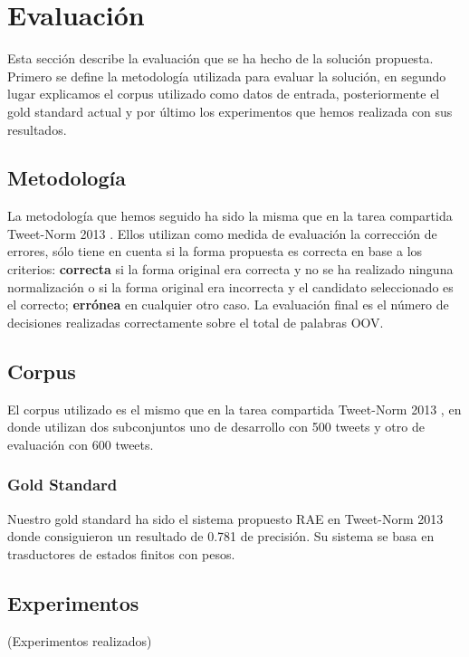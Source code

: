 \documentclass[spanish,12pt, a4paper,twoside]{paper}
\let\oldsection\section
\def\section{\cleardoublepage\oldsection}
\begin{document}
\section{Evaluación}\label{sec:evaluacion}
Esta sección describe la evaluación que se ha hecho de la solución propuesta. Primero se define la metodología utilizada para evaluar la solución, en segundo lugar explicamos el corpus utilizado como datos de entrada, posteriormente el gold standard actual y por último los experimentos que hemos realizada con sus resultados.
\subsection{Metodología}\label{sec:metodologia}
La metodología que hemos seguido ha sido la misma que en la tarea compartida Tweet-Norm 2013 \cite{tweetnorm}. Ellos utilizan como medida de evaluación la corrección de errores, sólo tiene en cuenta si la forma propuesta es correcta en base a los criterios: \textbf{correcta} si la forma original era correcta y no se ha realizado ninguna normalización o si la forma original era incorrecta y el candidato seleccionado es el correcto; \textbf{errónea} en cualquier otro caso. La evaluación final es el número de decisiones realizadas correctamente sobre el total de palabras OOV.

\subsection{Corpus}\label{sec:corpus}
El corpus utilizado es el mismo que en la tarea compartida Tweet-Norm 2013 \cite{tweetnorm}, en donde utilizan dos subconjuntos uno de desarrollo con 500 tweets y otro de evaluación con 600 tweets.

\subsubsection{Gold Standard}\label{sec:goldstandard}
Nuestro gold standard ha sido el sistema propuesto RAE \cite{porta:2013} en Tweet-Norm 2013 \cite{tweetnorm} donde consiguieron un resultado de 0.781 de precisión. Su sistema se basa en trasductores de estados finitos con pesos. 

\subsection{Experimentos}\label{sec:experimentos}
(Experimentos realizados)
\end{document}
